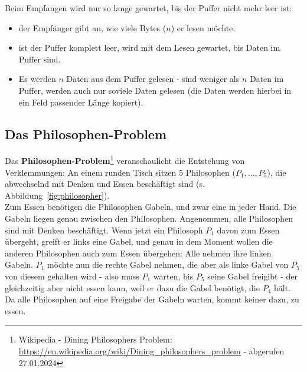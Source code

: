 Beim Empfangen wird nur so lange gewartet, bis der Puffer nicht mehr leer ist:
\begin{itemize}
    \item der Empfänger gibt an, wie viele Bytes ($n$) er lesen möchte.
    \item ist der Puffer komplett leer, wird mit dem Lesen gewartet, bis Daten im Puffer sind.
    \item Es werden $n$ Daten aus dem Puffer gelesen - sind weniger als $n$ Daten im Puffer, werden auch nur soviele Daten gelesen (die Daten werden hierbei in ein Feld passender Länge kopiert).
\end{itemize}

\subsection{Das Philosophen-Problem}
 Das \textbf{Philosophen-Problem}\footnote{
Wikipedia - Dining Philosophers Problem: \url{https://en.wikipedia.org/wiki/Dining_philosophers_problem} - abgerufen 27.01.2024
}
veranschaulicht die Entstehung von Verklemmungen: An einem runden Tisch sitzen 5 Philosophen ($P_1,...,P_5$), die abwechselnd mit Denken und Essen beschäftigt sind (s. Abbildung~\ref{fig:philosopher}).\\
\noindent
 Zum Essen benötigen die Philosophen Gabeln, und zwar eine in jeder Hand.
 Die Gabeln liegen genau zwischen den Philosophen.
 Angenommen, alle Philosophen sind mit Denken beschäftigt.
 Wenn jetzt ein Philosoph $P_1$ davon zum Essen übergeht, greift er links eine Gabel, und genau in dem Moment wollen die anderen Philosophen auch zum Essen übergehen: Alle nehmen ihre linken Gabeln.
$P_1$ möchte nun die rechte Gabel nehmen, die aber als linke Gabel von $P_5$ von diesem gehalten wird - also muss $P_1$ warten, bis $P_5$ seine Gabel freigibt - der gleichzeitig aber nicht essen kann, weil er dazu die Gabel benötigt, die $P_4$ hält.
Da alle Philosophen auf eine Freigabe der Gabeln warten, kommt keiner dazu, zu essen.

